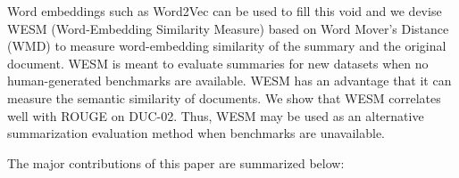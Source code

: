 \documentclass[a4paper,twoside]{article}
\begin{document}
Word embeddings such as Word2Vec can
be used to fill this void %
and
we devise WESM (Word-Embedding Similarity Measure)
based on Word Mover's Distance (WMD) \cite{wmd}
to measure word-embedding similarity of the summary and the original document. WESM is meant to evaluate summaries for new datasets when no human-generated benchmarks are available. WESM has an advantage that it can measure the semantic similarity of documents. We show that WESM correlates well with ROUGE on DUC-02. Thus, WESM may be used as an alternative summarization evaluation method when benchmarks are unavailable.



The major contributions of this paper are summarized below:
\end{document}
